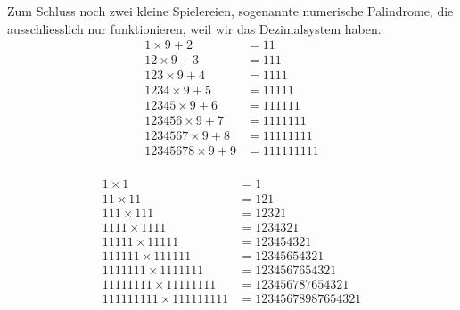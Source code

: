 Zum Schluss noch zwei kleine Spielereien, sogenannte numerische Palindrome, die ausschliesslich nur funktionieren, weil wir das Dezimalsystem haben. 
\begin{equation*}
\begin{aligned}
1\times9 + 2 &= 11\\
12\times9 + 3 &= 111\\
123\times9 + 4 &= 1111\\
1234\times9 + 5&= 11111\\
12345\times9 + 6 &= 111111\\
123456\times9 + 7 &= 1111111\\
1234567\times9 + 8 &= 11111111\\
12345678\times9 + 9 &= 111111111\\
\end{aligned}
\end{equation*}

\begin{equation*}
\begin{aligned}
1\times1 &= 1\\
11\times11 &= 121\\
111\times111 &= 12321\\
1111\times1111 &= 1234321\\
11111\times11111 &= 123454321\\
111111\times111111 &= 12345654321\\
1111111\times1111111 &= 1234567654321\\
11111111\times11111111 &= 123456787654321\\
111111111\times111111111 &= 12345678987654321
\end{aligned}
\end{equation*}
\hfill {}

\newpage

